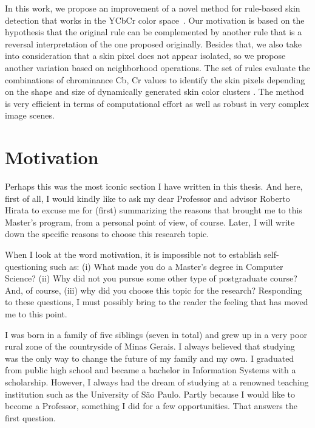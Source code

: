 In this work, we propose an improvement of a novel method for rule-based skin detection that works in the YCbCr color space~\citep{brancati:17}. Our motivation is based on the hypothesis that the original rule can be complemented by another rule that is a reversal interpretation of the one proposed originally. Besides that, we also take into consideration that a skin pixel does not appear isolated, so we propose another variation based on neighborhood operations. The set of rules evaluate the combinations of chrominance Cb, Cr values to identify the skin pixels depending on the shape and size of dynamically generated skin color clusters \citep{brancati:17}. The method is very efficient in terms of computational effort as well as robust in very complex image scenes.


\section{Motivation}
\label{sec:motivation}

Perhaps this was the most iconic section I have written in this thesis. And here, first of all, I would kindly like to ask my dear Professor and advisor Roberto Hirata to excuse me for (first) summarizing the reasons that brought me to this Master's program, from a personal point of view, of course. Later, I will write down the specific reasons to choose this research topic.

When I look at the word motivation, it is impossible not to establish self-questioning such as: (i) What made you do a Master's degree in Computer Science? (ii) Why did not you pursue some other type of postgraduate course? And, of course, (iii) why did you choose this topic for the research? Responding to these questions, I must possibly bring to the reader the feeling that has moved me to this point.

I was born in a family of five siblings (seven in total) and grew up in a very poor rural zone of the countryside of Minas Gerais. I always believed that studying was the only way to change the future of my family and my own. I graduated from public high school and became a bachelor in Information Systems with a scholarship. However, I always had the dream of studying at a renowned teaching institution such as the University of São Paulo. Partly because I would like to become a Professor, something I did for a few opportunities. That answers the first question.

